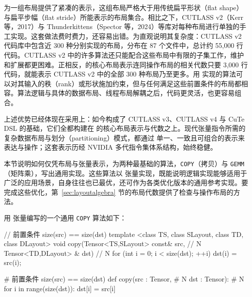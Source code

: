 \label{sec:algorithms}

\CuTe 为一组布局提供了紧凑的表示，这组布局严格大于用传统扁平形状（flat shape）与扁平步幅（flat stride）所能表示的布局集合。相比之下，CUTLASS v2（Kerr 等，2017）与 Thunderkittens（Spector 等，2024）等库对每种布局进行单独的手工实现。这套做法费时费力，还容易出错。为直观说明其复杂度：CUTLASS v2 代码库中包含近 300 种分别实现的布局，分布在 87 个文件中，总计约 55,000 行代码。CUTLASS v2 中的许多算法还只能配合这些布局中有限的子集工作，维护和扩展都更困难。正相反，\CuTe 的核心布局表示连同操作布局的相关代数只要 3,000 行代码，就能表示 CUTLASS v2 中的全部 300 种布局乃至更多。用 \CuTe 实现的算法可以对其输入的秩（rank）或形状施加约束，但与任何满足这些前置条件的布局都相容。算法逻辑与具体的数据布局、线程布局解耦之后，代码更灵活，也更容易组合。

上述优势已经体现在采用上：\CuTe 如今构成了 CUTLASS v3、CUTLASS v4 与 CuTe DSL 的基础，它们全都构建在 \CuTe 的核心布局表示与代数之上。现代张量指令所需的复杂数据布局与划分（partitioning）模式，都通过 \CuTe 单一、一致且可组合的表示来表达与操作；这套表示历经 NVIDIA 多代指令集体系结构，始终稳健。

本节说明如何仅凭布局与张量表示，为两种最基础的算法，{\tt COPY}（拷贝）与 {\tt GEMM}（矩阵乘），写出通用实现。这些算法以 \CuTe 张量实现，既能说明逻辑实现能够适用于广泛的应用场景，自身往往也已最优，还可作为各类优化版本的通用参考实现。要完成这些优化，第~\ref{sec:layoutalgebra} 节的布局代数提供了检查与操作布局的方法。

\label{sec:copy}

用 \CuTe 张量编写的一个通用 {\tt COPY} 算法如下：

\noindent
\begin{minipage}[t]{0.55\textwidth}
\begin{cpp}
// 前置条件 size(src) == size(dst)
template <class TS, class SLayout,
          class TD, class DLayout>
void
copy(Tensor<TS,SLayout> const& src,  // N
     Tensor<TD,DLayout>      & dst)  // N
{
  for (int i = 0; i < size(dst); ++i) {
    dst(i) = src(i);
  }
}
\end{cpp}
\end{minipage}
\hfill
\begin{minipage}[t]{0.40\textwidth}
\begin{python}
# 前置条件 size(src) == size(dst)
def copy(src : Tensor,   # N
         dst : Tensor):  # N
  for i in range(size(dst)):
    dst[i] = src[i]
\end{python}
\end{minipage}


